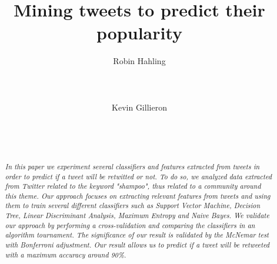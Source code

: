 \documentclass{sigchi}
\begin{document}
\title{Mining tweets to predict their popularity}

\author{
  \alignauthor Robin Hahling\\
    \\
    \\
    \\
  \alignauthor Kevin Gillieron\\
    \\
    \\
    \\
}

\maketitle

\begin{abstract}
\textit{
In this paper we experiment several classifiers and features extracted from
tweets in order to predict if a tweet will be retwitted or not.
To do so, we analyzed data extracted from Twitter related to the keyword
"shampoo", thus related to a community around this theme.
Our approach focuses on extracting relevant features from tweets and using them
to train several different classifiers such as Support Vector Machine, Decision
Tree, Linear Discriminant Analysis, Maximum Entropy and Naive Bayes.
We validate our approach by performing a cross-validation and comparing the
classifiers in an algorithm tournament. The significance of our result is
validated by the McNemar test with Bonferroni adjustment.
Our result allows us to predict if a tweet will be retweeted with a maximum 
accuracy around 90\%.
}
\end{abstract}








\end{document}
